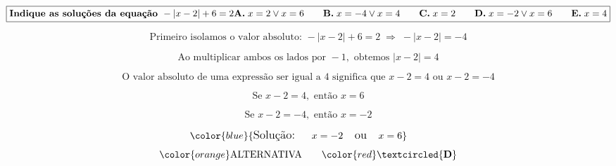 

\[
\boxed{\textbf{Indique as soluções da equação } -|x - 2| + 6 = 2 \\
\\
\textbf{A.} \; x = 2 \vee x = 6
\quad\quad
\textbf{B.} \; x = -4 \vee x = 4
\quad\quad
\textbf{C.} \; x = 2
\quad\quad
\textbf{D.} \; x = -2 \vee x = 6
\quad\quad
\textbf{E.} \; x = 4}

\]







\[
\text{Primeiro isolamos o valor absoluto: } -|x - 2| + 6 = 2 \;\Rightarrow\; -|x - 2| = -4
\]





\[
\text{Ao multiplicar ambos os lados por } -1, \text{ obtemos } |x - 2| = 4
\]





\[
\text{O valor absoluto de uma expressão ser igual a 4 significa que } x - 2 = 4 \text{ ou } x - 2 = -4
\]





\[
\text{Se } x - 2 = 4, \text{ então } x = 6
\]





\[
\text{Se } x - 2 = -4, \text{ então } x = -2
\]




\[
\color{blue}{\large {\text{Solução: }\quad x = -2 \quad \text{ou} \quad x = 6}}
 \quad\quad  \]
\[\color{orange}\text{ALTERNATIVA}  \quad\quad \color{red} 


\textcircled{\textbf{D}}



\]
 






